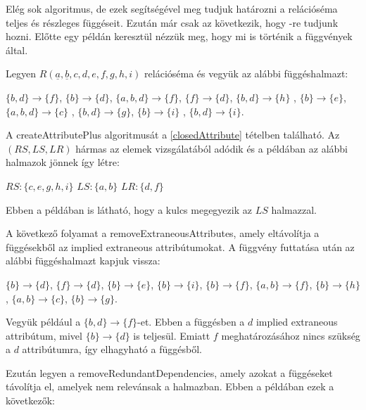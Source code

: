 Elég sok algoritmus, de ezek segítségével meg tudjuk határozni a relációséma teljes és részleges függéseit. Ezután már csak az következik, hogy \nfk-re tudjunk hozni. Előtte egy példán keresztül nézzük meg, hogy mi is történik a függvények által.

\begin{pld}
Legyen $R(\underline{a},\underline{b},c,d,e,f,g,h,i)$ relációséma és vegyük az alábbi függéshalmazt:
\begin{center}
    $\{b,d\} \longrightarrow \{f\}$, 
    $\{b\} \longrightarrow \{d\}$, 
    $\{a,b,d\} \longrightarrow \{f\}$, 
    $\{f\} \longrightarrow \{d\}$, \break
    $\{b,d\} \longrightarrow \{h\}$ ,
    $\{b\} \longrightarrow \{e\}$, 
    $\{a,b,d\} \longrightarrow \{c\}$ ,
    $\{b,d\} \longrightarrow \{g\}$, \break
    $\{b\} \longrightarrow \{i\}$ ,
    $\{b,d\} \longrightarrow \{i\}$.\break
\end{center}

A createAttributePlus algoritmusát a \ref{closedAttribute} tételben található. Az $(RS,LS,LR)$ hármas az elemek vizsgálatából adódik és a példában az alábbi halmazok jönnek így létre:

\begin{center}
    $RS: \{c,e,g,h,i\}$ \break
    $LS: \{a,b\}$\break
    $LR: \{d,f\}$
\end{center}

Ebben a példában is látható, hogy a kulcs megegyezik az $LS$ halmazzal.\par
A következő folyamat a removeExtraneousAttributes, amely eltávolítja a függésekből az implied extraneous attribútumokat. A függvény futtatása után az alábbi függéshalmazt kapjuk vissza:

\begin{center}
    $\{b\} \longrightarrow \{d\}$, 
    $\{f\} \longrightarrow \{d\}$, 
    $\{b\} \longrightarrow \{e\}$, 
    $\{b\} \longrightarrow \{i\}$,\break 
    $\{b\} \longrightarrow \{f\}$, 
    $\{a,b\} \longrightarrow \{f\}$, 
    $\{b\} \longrightarrow \{h\}$, 
    $\{a,b\} \longrightarrow \{c\}$, 
    $\{b\} \longrightarrow \{g\}$.
\end{center}

Vegyük például a $\{b,d\} \longrightarrow \{f\}$-et. Ebben a függésben a $d$ implied extraneous attribútum, mivel $\{b\} \longrightarrow \{d\}$ is teljesül. Emiatt $f$ meghatározásához nincs szükség a $d$ attribútumra, így elhagyható a függésből. \par

Ezután legyen a removeRedundantDependencies, amely azokat a függéseket távolítja el, amelyek nem relevánsak a halmazban. Ebben a példában ezek a következők:


\end{pld}

